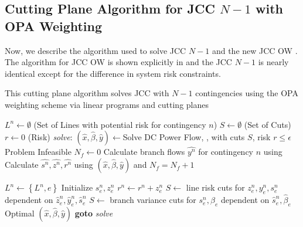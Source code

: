 \subsection{Cutting Plane Algorithm for JCC $N-1$ with OPA Weighting}
Now, we describe the algorithm used to solve  JCC $N-1$  and the new JCC OW .  The algorithm for JCC OW is shown explicitly in  and the JCC $N-1$ is nearly identical except for the difference in system risk constraints.
\begin{algorithm}
\caption[Cutting plane algorithm for solving JCC $N-1$ with OPA weighting]{This cutting plane algorithm solves JCC  with $N-1$ contingencies  using the OPA weighting scheme  via linear programs and cutting planes}\label{jcc_ow_alg}
\begin{algorithmic}
\State $L^n \gets \emptyset$  (Set of Lines with potential risk for contingency $n$)
\State $S \gets \emptyset$  (Set of Cuts)
\State $r \gets 0$ (Risk)
\BState \emph{solve}:
\State $(\hat{x},\hat{\beta},\hat{y}) \gets $Solve DC Power Flow, , with cuts $S$, risk $r\leq\epsilon$
 \Return Problem Infeasible 
\EndIf
\State $N_f \gets 0$
\State Calculate branch flows $\hat{y^n}$ for contingency $n$ using 
\State Calculate $\hat{s^n},\hat{z^n},\hat{r^n}$ using $(\hat{x},\hat{\beta},\hat{y})$ and 
 $N_f = N_f + 1$
\EndIf

            \State $L^n \gets \left\{L^n,e\right\}$
            \State Initialize $s^n_e,z^n_e$
            \State $r^n \gets r^n + z^n_e$
    \EndIf            
    \State $S \gets$ line risk cuts  for $z^n_e,y^n_e,s^n_e$ dependent on $\hat{z}^n_e,\hat{y}^n_e,\hat{s}^n_e$
    \State $S \gets$ branch variance cuts  for $s^n_e,\beta_e$ dependent on $\hat{s}^n_e,\hat{\beta}_e$
\EndIf
\EndFor
\EndFor
{} \Return Optimal $(\hat{x},\hat{\beta},\hat{y})$
\Else
\State \textbf{goto} \emph{solve}
\EndIf
\EndProcedure
\end{algorithmic}
\end{algorithm}



